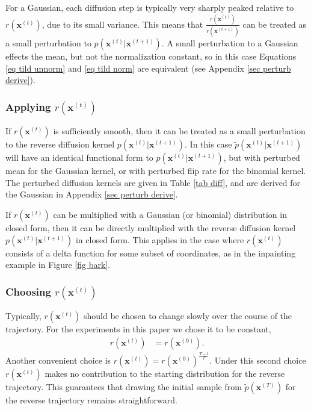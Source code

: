 \documentclass{article}
\newcommand{\mb}{\mathbf}
\begin{document}
For a Gaussian, each diffusion step is typically very sharply peaked relative to $r\left( \mb x^{(t)} \right)$, due to its small variance.
This means that $\frac{
		r\left( \mb x^{(t)} \right)
	}{
	 	r\left( \mb x^{(t+1)} \right)
	}$
can be treated as a small perturbation to $p\left( \mb x^{(t)} | \mb x^{(t+1)} \right)$.
A small perturbation to a Gaussian effects the mean, but not the normalization constant,
so in this case Equations \ref{eq tild unnorm} and \ref{eq tild norm} are equivalent
(see Appendix \ref{sec perturb derive}).

\subsubsection{Applying $r\left( \mb x^{(t)} \right)$}

If $r\left( \mb x^{(t)} \right)$ is sufficiently smooth, 
then it can be treated as a small
perturbation to the reverse diffusion kernel $p\left( \mb x^{(t)} | \mb x^{(t+1)} \right)$. In this case $\tilde{p}\left( \mb x^{(t)} | \mb x^{(t+1)} \right)$ will have an identical functional form to $p\left( \mb x^{(t)} | \mb x^{(t+1)} \right)$, 
but with perturbed mean for the Gaussian kernel, or with perturbed flip rate for the binomial kernel. 
The perturbed diffusion kernels 
are given in Table \ref{tab diff}, and are derived for the Gaussian in Appendix \ref{sec perturb derive}.

If $r\left( \mb x^{(t)} \right)$ can be multiplied with a Gaussian (or binomial) distribution in closed form,
then it can be directly multiplied with the reverse diffusion kernel $p\left( \mb x^{(t)} | \mb x^{(t+1)} \right)$ in closed form.
This applies in the case where $r\left( \mb x^{(t)} \right)$ consists of a delta function for some subset of coordinates, as in
the inpainting example in Figure \ref{fig bark}.

\subsubsection{Choosing $r\left( \mb x^{(t)} \right)$}

Typically, $r\left( \mb x^{(t)} \right)$ should be chosen to change slowly over the course of the trajectory.  For the experiments in this paper we chose it to be constant,
\begin{align}
r\left( \mb x^{(t)} \right) &= r\left( \mb x^{(0)} \right).
\end{align}
Another convenient choice is $r\left( \mb x^{(t)} \right) = r\left( \mb x^{(0)} \right)^\frac{T-t}{T}$.  
Under this second choice $r\left( \mb x^{(t)} \right)$ makes no contribution to the starting distribution for the reverse trajectory. 
This guarantees that drawing the initial sample from 
$\tilde{p}\left( \mb x^{(T)} \right)$ for the reverse trajectory remains straightforward.
\end{document}
